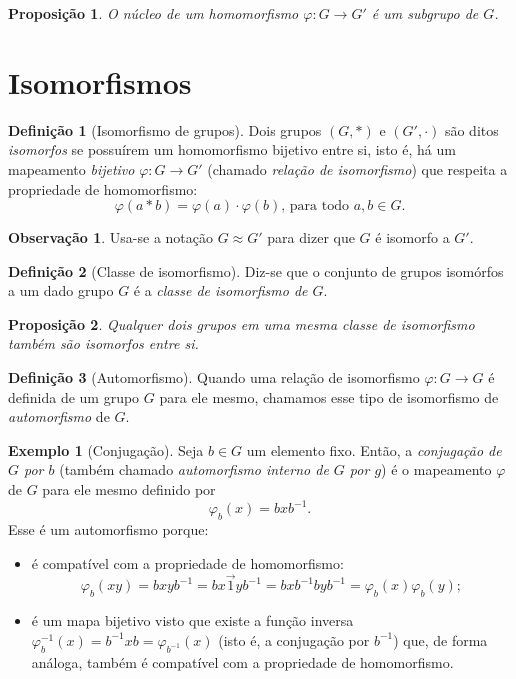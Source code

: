 \documentclass[a4paper,12pt]{report}
\theoremstyle{plain}
\newtheorem{proposicao}{Proposição}[section]
\theoremstyle{definition}
\newtheorem{definicao}{Definição}[section]
\newtheorem{observacao}{Observação}[section]
\newtheorem{exemplo}{Exemplo}[section]
\begin{document}
\begin{proposicao}
	O núcleo de um homomorfismo $\varphi: G \longrightarrow G'$ é um subgrupo de $G$.
\end{proposicao}

\section{Isomorfismos}

\begin{definicao}[Isomorfismo de grupos]
	Dois grupos \((G,*)\) e \((G',\cdot)\) são ditos \emph{isomorfos} se possuírem um homomorfismo bijetivo entre si, isto é, há um mapeamento \emph{bijetivo} $\varphi: G \longrightarrow G'$ (chamado \emph{relação de isomorfismo}) que respeita a propriedade de homomorfismo:
	\[\varphi(a*b) = \varphi(a)\cdot\varphi(b) \text{, para todo } a,b \in G.\] 
\end{definicao}

\begin{observacao}
	Usa-se a notação $G \approx G'$ para dizer que $G$ é isomorfo a $G'$.  
\end{observacao}

\begin{definicao}[Classe de isomorfismo]
	Diz-se que o conjunto de grupos isomórfos a um dado grupo \(G\) é a \emph{classe de isomorfismo de \(G\)}.	
\end{definicao}

\begin{proposicao}
	Qualquer dois grupos em uma mesma classe de isomorfismo também são isomorfos entre si.
\end{proposicao}

\begin{definicao}[Automorfismo]
	Quando uma relação de isomorfismo \(\varphi: G\longrightarrow G\) é definida de um grupo \(G\) para ele mesmo,	chamamos esse tipo de isomorfismo de \emph{automorfismo} de \(G\).
\end{definicao}

\begin{exemplo}[Conjugação]
	 Seja \(b\in G\) um elemento fixo. Então, a
	\emph{conjugação de \(G\) por \(b\)} (também chamado \emph{automorfismo interno de $G$ por $g$}) é o mapeamento \(\varphi\) de \(G\)
	para ele mesmo definido por
	\[\varphi_b(x) = bxb^{-1}.\]
	Esse é um automorfismo porque:
	\begin{itemize}
		\item é compatível com a propriedade de homomorfismo: \[\varphi_b(xy) = bxyb^{-1} = bx\vec{1}yb^{-1} = bxb^{-1}byb^{-1} = \varphi_b(x)\varphi_b(y);\]
		\item é um mapa bijetivo visto que existe a função inversa $\varphi_b^{-1}(x) = b^{-1}xb = \varphi_{b^{-1}}(x)$ (isto é, a conjugação por \(b^{-1}\)) que, de forma análoga, também é compatível com a propriedade de homomorfismo.
	\end{itemize}
\end{exemplo}
\end{document}
